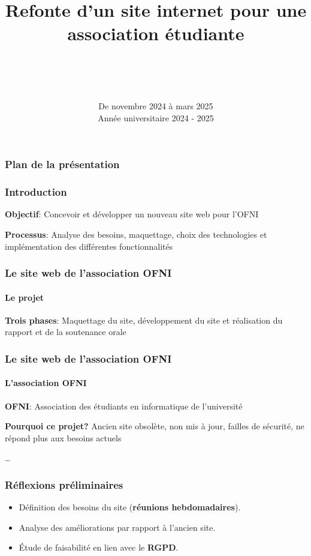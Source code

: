 \documentclass[pdf]{beamer}
\title[Refonte du site internet de l'association]{Refonte d'un site internet pour une association étudiante}
\author[OFNI]{
    \nom{Tristan}{Amiotte-Suchet} \\
    \nom{Antoine}{Cuinet} \\
    \nom{Gaspard}{Quentin} \\
}
\institute{Université de Franche Comté}
\date{De novembre 2024 à mars 2025 \\ Année universitaire 2024 - 2025}
\begin{document}

\begin{frame}
    \frametitle{Plan de la présentation}
    \tableofcontents[hideallsubsections]
\end{frame}


\begin{frame}
    \frametitle{Introduction}
    \centering
    \textbf{Objectif}: Concevoir et développer un nouveau site web pour l’OFNI
    \vspace{1cm}

    \textbf{Processus}: Analyse des besoins, maquettage, choix des technologies et implémentation des différentes fonctionnalités
\end{frame}

\begin{frame}
    \frametitle{Le site web de l’association OFNI}
    \framesubtitle{Le projet}
    \centering
    \textbf{Trois phases}: Maquettage du site, développement du site et réalisation du rapport et de la soutenance orale
\end{frame}

\begin{frame}
    \frametitle{Le site web de l’association OFNI}
    \framesubtitle{L’association OFNI}
    \centering
    \textbf{OFNI}: Association des étudiants en informatique de l’université
    \vspace{1cm}

    \textbf{Pourquoi ce projet?} Ancien site obsolète, non mis à jour, failles de sécurité, ne répond plus aux besoins actuels
\end{frame}





\begin{frame}
    \dots
\end{frame}






\begin{frame}
    \frametitle{Réflexions préliminaires}

    \begin{itemize}
        \item Définition des besoins du site (\textbf{réunions hebdomadaires}).
        \item Analyse des améliorations par rapport à l’ancien site.
        \item Étude de faisabilité en lien avec le \textbf{RGPD}.
    \end{itemize}
\end{frame}
\end{document}
